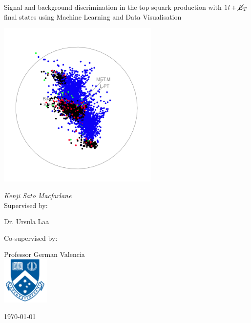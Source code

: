 \documentclass[12pt,a4paper]{report}
\begin{document}
\begin{titlepage}


				\centering

				{\Large{}\selectfont Signal and background discrimination in the top squark production with   $\text{1\textit{l}} + \cancel{\it{E}}_{T} $ final states using Machine Learning and Data Visualisation \par}
				\vspace{1.0cm}
			    \includegraphics[width=0.6\textwidth]{title.png}\par\vspace{1cm}
				{\Large\itshape Kenji Sato Macfarlane\\}
				\vfill
				Supervised by:\par
				Dr. Ursula Laa \par 
				Co-supervised by:\par
				Professor German Valencia \\
				
				\vfill
				\includegraphics[width=0.175\textwidth]{monashlogo.png}\par\vspace{0.5cm}
				
				{\large \today\par}

\end{titlepage}
\end{document}
